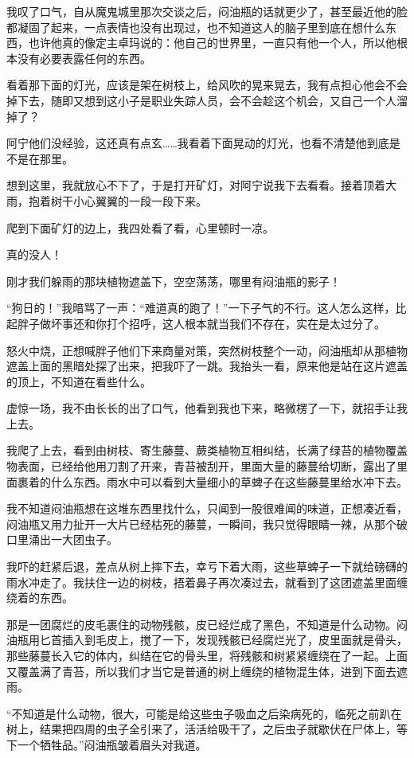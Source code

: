 我叹了口气，自从魔鬼城里那次交谈之后，闷油瓶的话就更少了，甚至最近他的脸都凝固了起来，一点表情也没有出现过，也不知道这人的脑子里到底在想什么东西，也许他真的像定主卓玛说的：他自己的世界里，一直只有他一个人，所以他根本没有必要表露任何的东西。

看着那下面的灯光，应该是架在树枝上，给风吹的晃来晃去，我有点担心他会不会掉下去，随即又想到这小子是职业失踪人员，会不会趁这个机会，又自己一个人溜掉了？

阿宁他们没经验，这还真有点玄……我看着下面晃动的灯光，也看不清楚他到底是不是在那里。

想到这里，我就放心不下了，于是打开矿灯，对阿宁说我下去看看。接着顶着大雨，抱着树干小心翼翼的一段一段下来。

爬到下面矿灯的边上，我四处看了看，心里顿时一凉。

真的没人！

刚才我们躲雨的那块植物遮盖下，空空荡荡，哪里有闷油瓶的影子！

“狗日的！”我暗骂了一声：“难道真的跑了！”一下子气的不行。这人怎么这样，比起胖子做坏事还和你打个招呼，这人根本就当我们不存在，实在是太过分了。

怒火中烧，正想喊胖子他们下来商量对策，突然树枝整个一动，闷油瓶却从那植物遮盖上面的黑暗处探了出来，把我吓了一跳。我抬头一看，原来他是站在这片遮盖的顶上，不知道在看些什么。

虚惊一场，我不由长长的出了口气，他看到我也下来，略微楞了一下，就招手让我上去。

我爬了上去，看到由树枝、寄生藤蔓、蕨类植物互相纠结，长满了绿苔的植物覆盖物表面，已经给他用刀割了开来，青苔被刮开，里面大量的藤蔓给切断，露出了里面裹着的什么东西。雨水中可以看到大量细小的草蜱子在这些藤蔓里给水冲下去。

我不知道闷油瓶想在这堆东西里找什么，只闻到一股很难闻的味道，正想凑近看，闷油瓶又用力扯开一大片已经枯死的藤蔓，一瞬间，我只觉得眼睛一辣，从那个破口里涌出一大团虫子。

我吓的赶紧后退，差点从树上摔下去，幸亏下着大雨，这些草蜱子一下就给磅礴的雨水冲走了。我扶住一边的树枝，捂着鼻子再次凑过去，就看到了这团遮盖里面缠绕着的东西。

那是一团腐烂的皮毛裹住的动物残骸，皮已经烂成了黑色，不知道是什么动物。闷油瓶用匕首插入到毛皮上，搅了一下，发现残骸已经腐烂光了，皮里面就是骨头，那些藤蔓长入它的体内，纠结在它的骨头里，将残骸和树紧紧缠绕在了一起。上面又覆盖满了青苔，所以我们才当它是普通的树上缠绕的植物混生体，进到下面去遮雨。

“不知道是什么动物，很大，可能是给这些虫子吸血之后染病死的，临死之前趴在树上，结果把四周的虫子全引来了，活活给吸干了，之后虫子就歇伏在尸体上，等下一个牺牲品。”闷油瓶皱着眉头对我道。

